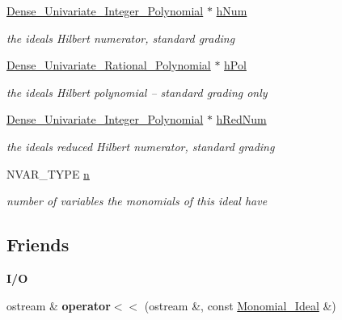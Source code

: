 \begin{DoxyCompactItemize}
\mbox{\label{class_monomial___ideal_a2613e425082e968058426465d309abbc}} 
\hyperlink{class_dense___univariate___integer___polynomial}{Dense\+\_\+\+Univariate\+\_\+\+Integer\+\_\+\+Polynomial} $\ast$ \hyperlink{class_monomial___ideal_a2613e425082e968058426465d309abbc}{h\+Num}
\begin{DoxyCompactList}\small\item\em the ideal\textquotesingle{}s Hilbert numerator, standard grading \end{DoxyCompactList}\item 
\mbox{\label{class_monomial___ideal_a90e5ee8eb2a8c5b3ebe63ee381f42535}} 
\hyperlink{class_dense___univariate___rational___polynomial}{Dense\+\_\+\+Univariate\+\_\+\+Rational\+\_\+\+Polynomial} $\ast$ \hyperlink{class_monomial___ideal_a90e5ee8eb2a8c5b3ebe63ee381f42535}{h\+Pol}
\begin{DoxyCompactList}\small\item\em the ideal\textquotesingle{}s Hilbert polynomial -- standard grading only \end{DoxyCompactList}\item 
\mbox{\label{class_monomial___ideal_a4a060a173e9550bf986c9aa2697cbc27}} 
\hyperlink{class_dense___univariate___integer___polynomial}{Dense\+\_\+\+Univariate\+\_\+\+Integer\+\_\+\+Polynomial} $\ast$ \hyperlink{class_monomial___ideal_a4a060a173e9550bf986c9aa2697cbc27}{h\+Red\+Num}
\begin{DoxyCompactList}\small\item\em the ideal\textquotesingle{}s reduced Hilbert numerator, standard grading \end{DoxyCompactList}\item 
\mbox{\label{class_monomial___ideal_a4340e27f56e4229b2357e00bd6c98021}} 
N\+V\+A\+R\+\_\+\+T\+Y\+PE \hyperlink{class_monomial___ideal_a4340e27f56e4229b2357e00bd6c98021}{n}
\begin{DoxyCompactList}\small\item\em number of variables the monomials of this ideal have \end{DoxyCompactList}\end{DoxyCompactItemize}
\subsection*{Friends}
\begin{Indent}\textbf{ I/O}\par
\begin{DoxyCompactItemize}
\item 
\mbox{\label{class_monomial___ideal_afcb33f97b01be14e0eefe468fe752b7b}} 
ostream \& {\bfseries operator$<$$<$} (ostream \&, const \hyperlink{class_monomial___ideal}{Monomial\+\_\+\+Ideal} \&)
\end{DoxyCompactItemize}
\end{Indent}


